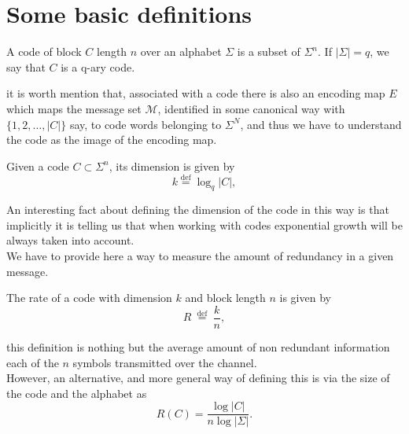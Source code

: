 \section{Some basic definitions}
\begin{definition}[Code]
A code of block $C$ length $n$ over an alphabet $\Sigma$ is a subset of $\Sigma^n$.  If $|\Sigma|=q$, we say that $C$ is a q-ary code.
\end{definition}
it is worth mention that, associated with a code there is also an encoding map $E$ which maps the message set $\mathcal{M}$, identified in some canonical way with $\{1,2,\ldots,|C|\}$ say, to code words belonging to $\Sigma^N$, and thus we have to understand the code as the image of the encoding map\cite{jaynes_probability_2003}.
\begin{definition}
Given a code $C\subset\Sigma^n$, its dimension is given by
  \begin{equation}
  k \stackrel{\mathrm{def}}{=} \log _{q}|C|,
  \label{CH2:diemnsion_of_code}
  \end{equation}
 \end{definition}
An interesting fact about defining  the dimension of the code in this way is that implicitly it is telling us that when working with codes exponential growth will be always taken into account.\\
We have to provide here a way to measure the amount of redundancy in a given message.
	\begin{definition}
	The rate of a code with dimension $k$ and block length $n$ is given by 
	\begin{equation}
		R \stackrel{\text { def }}{=} \frac{k}{n},
		\label{CH2:Rate_of_code}
	\end{equation}
	\end{definition}
this definition is nothing but the average amount of non redundant information each of the $n$ symbols transmitted over the channel.\\ However, an alternative, and more general way of defining this is via the size of the code and the alphabet as
\begin{equation}
R(C)=\frac{\log |C|}{n \log |\Sigma|}.
\end{equation}


